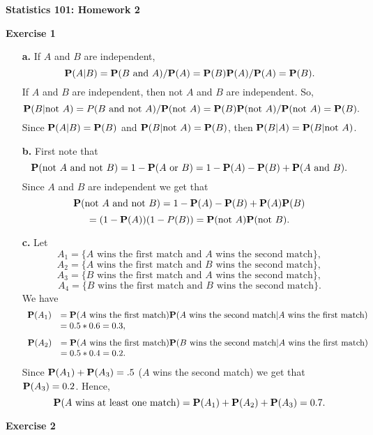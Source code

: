 \documentclass[10pt]{article}
\def\Pr{{\bf P}}
\begin{document}
\begin{center}
{\bf \large Statistics 101: Homework 2}
\end{center}


{\bf Exercise 1} 
\begin{itemize}
\item[\bf a.] If $A$ and $B$ are independent, 
$$\Pr(A|B)=\Pr(B\mbox{ and }A)/\Pr(A)=\Pr(B)\Pr(A)/\Pr(A)=\Pr(B).$$
If $A$ and $B$ are independent, then not $A$ and $B$ are independent. So,
$$\Pr(B|\mbox{not }A)=P(B\mbox{ and not }A)/\Pr(\mbox{not }A)=\Pr(B)\Pr(\mbox{not }A)/\Pr(\mbox{not }A)=\Pr(B).$$
Since $\Pr(A|B)=\Pr(B)$ and $\Pr(B|\mbox{not }A)=\Pr(B)$, then $\Pr(B|A)=\Pr(B|\mbox{not }A)$.
\item[\bf b.] First note that
$$\Pr(\mbox{not }A\mbox{ and }\mbox{not }B)=1-\Pr(A\mbox{ or }B)=1-\Pr(A)-\Pr(B)+\Pr(A\mbox{ and }B).$$
Since $A$ and $B$ are independent we get that
$$\Pr(\mbox{not }A\mbox{ and }\mbox{not }B)= 1-\Pr(A)-\Pr(B)+\Pr(A)\Pr(B)$$
$$=(1-\Pr(A))(1-P(B))=\Pr(\mbox{not }A)\Pr(\mbox{not }B). $$
\item[\bf c.] Let 
$$A_1=\{A\mbox{ wins the first match and }A\mbox{ wins the second  match}\},$$
$$A_2=\{A\mbox{ wins the first match and }B\mbox{ wins the second  match}\},$$
$$A_3=\{B\mbox{ wins the first match and }A\mbox{ wins the second  match}\},$$
$$A_4=\{B\mbox{ wins the first match and }B\mbox{ wins the second  match}\}.$$
We have
$$\begin{array}{cl}
\Pr(A_1)&=\Pr(A\mbox{ wins the first match})\Pr(A\mbox{ wins the second  match}|A\mbox{ wins the first match})\\
       &=0.5*0.6=0.3,
\end{array}$$
$$\begin{array}{cl}
\Pr(A_2)&=\Pr(A\mbox{ wins the first match})\Pr(B\mbox{ wins the second  match}|A\mbox{ wins the first match})\\
       &=0.5*0.4=0.2.
\end{array}$$
Since $\Pr(A_1)+\Pr(A_3)=.5$ ($A$ wins the second match) we get that 
$\Pr(A_3)=0.2$. Hence, 
$$\Pr(A\mbox{ wins at least one match})=\Pr(A_1)+\Pr(A_2)+\Pr(A_3)=0.7.$$
\end{itemize}

{\bf Exercise 2}
\end{document}
